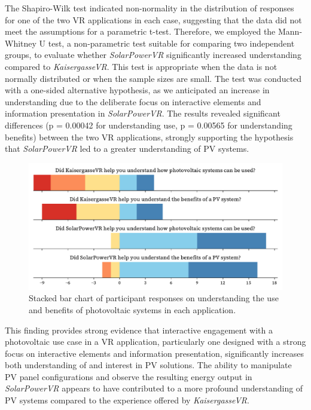 \documentclass[draft, final]{vutinfth} %
\begin{document}
The Shapiro-Wilk test indicated non-normality in the distribution of responses for one of the two VR applications in each case, suggesting that the data did not meet the assumptions for a parametric t-test. Therefore, we employed the Mann-Whitney U test, a non-parametric test suitable for comparing two independent groups, to evaluate whether \textit{SolarPowerVR} significantly increased understanding compared to \textit{KaisergasseVR}. This test is appropriate when the data is not normally distributed or when the sample sizes are small. The test was conducted with a one-sided alternative hypothesis, as we anticipated an increase in understanding due to the deliberate focus on interactive elements and information presentation in \textit{SolarPowerVR}. The results revealed significant differences (p = 0.00042 for understanding use, p = 0.00565 for understanding benefits) between the two VR applications, strongly supporting the hypothesis that \textit{SolarPowerVR} led to a greater understanding of PV systems.

\begin{figure}[h]
    \centering
    \includegraphics[width=\textwidth]{graphics/research-2.pdf}
    \caption{Stacked bar chart of participant responses on understanding the use and benefits of photovoltaic systems in each application.}
    \label{fig:research-2}
\end{figure}

This finding provides strong evidence that interactive engagement with a photovoltaic use case in a VR application, particularly one designed with a strong focus on interactive elements and information presentation, significantly increases both understanding of and interest in PV solutions. The ability to manipulate PV panel configurations and observe the resulting energy output in \textit{SolarPowerVR} appears to have contributed to a more profound understanding of PV systems compared to the experience offered by \textit{KaisergasseVR}.
\end{document}
